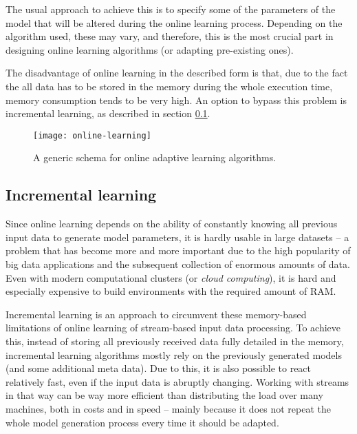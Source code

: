 The usual approach to achieve this is to specify some of the parameters of the model that will be altered during the online learning process. Depending on the algorithm used, these may vary, and therefore, this is the most crucial part in designing online learning algorithms (or adapting pre-existing ones). \cite{Gama2014} 

The disadvantage of online learning in the described form is that, due to the fact the all data has to be stored in the memory during the whole execution time, memory consumption tends to be very high. An option to bypass this problem is incremental learning, as described in section \ref{sec:incremental-learning}.

\begin{figure}
	\centering
  \texttt{[image: online-learning]}
	\caption{A generic schema for online adaptive learning algorithms. \cite{Gama2014}}
\end{figure}
\label{fig:online-learning}

\subsection{Incremental learning}
\label{sec:incremental-learning}
Since online learning depends on the ability of constantly knowing all previous input data to generate model parameters, it is hardly usable in large datasets -- a problem that has become more and more important due to the high popularity of big data applications and the subsequent collection of enormous amounts of data. Even with modern computational clusters (or \textit{cloud computing}), it is hard and especially expensive to build environments with the required amount of RAM. 

Incremental learning is an approach to circumvent these memory-based limitations of online learning of stream-based input data processing. To achieve this, instead of storing all previously received data fully detailed in the memory, incremental learning algorithms mostly rely on the previously generated models (and some additional meta data). Due to this, it is also possible to react relatively fast, even if the input data is abruptly changing. Working with streams in that way can be way more efficient than distributing the load over many machines, both in costs and in speed -- mainly because it does not repeat the whole model generation process every time it should be adapted. \cite{Gepperth2016}















